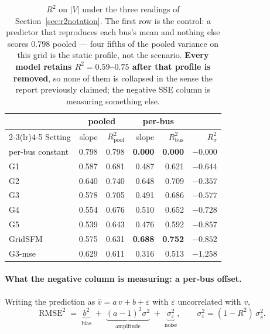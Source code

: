 \documentclass[10pt]{article}
\begin{document}
\begin{table}[H]
\centering\footnotesize
\begin{tabular}{lrrrrr}
\toprule
& \multicolumn{2}{c}{pooled} & \multicolumn{2}{c}{per-bus} & \\
\cmidrule(lr){2-3}\cmidrule(lr){4-5}
Setting & slope & $R^2_{\mathrm{pool}}$ & slope & $R^2_{\mathrm{bus}}$ & $R^2_{\sigma}$\\
\midrule
per-bus constant & 0.798 & 0.798 & \textbf{0.000} & \textbf{0.000} & $-0.000$\\
\midrule
G1 & 0.587 & 0.681 & 0.487 & 0.621 & $-0.644$\\
G2 & 0.640 & 0.740 & 0.648 & 0.709 & $-0.357$\\
G3 & 0.578 & 0.705 & 0.491 & 0.686 & $-0.577$\\
G4 & 0.554 & 0.676 & 0.510 & 0.652 & $-0.728$\\
G5 & 0.539 & 0.643 & 0.476 & 0.592 & $-0.857$\\
GridSFM & 0.575 & 0.631 & \textbf{0.688} & \textbf{0.752} & $-0.852$\\
G3-mse & 0.629 & 0.611 & 0.316 & 0.513 & $-1.258$\\
\bottomrule
\end{tabular}
\caption{$R^2$ on $|V|$ under the three readings of
Section~\ref{sec:r2notation}.  The first row is the
control: a predictor that reproduces each bus's mean and nothing else scores
$0.798$ pooled --- four fifths of the pooled variance on this grid is the
static profile, not the scenario.  \textbf{Every model retains
$R^2=0.59$--$0.75$ after that profile is removed}, so none of them is collapsed
in the sense the report previously claimed; the negative SSE column is measuring
something else.}
\end{table}

\paragraph{What the negative column is measuring: a per-bus offset.}  Writing
the prediction as $\hat v = a\,v + b + \varepsilon$ with $\varepsilon$
uncorrelated with $v$,
\[
  \mathrm{RMSE}^2 \;=\; \underbrace{b^2}_{\text{bias}}
  \;+\;\underbrace{(a-1)^2\sigma^2}_{\text{amplitude}}
  \;+\;\underbrace{\sigma_\varepsilon^2}_{\text{noise}},
  \qquad \sigma_\varepsilon^2=(1-R^2)\,\sigma_{\hat v}^2 .
\]
\end{document}
